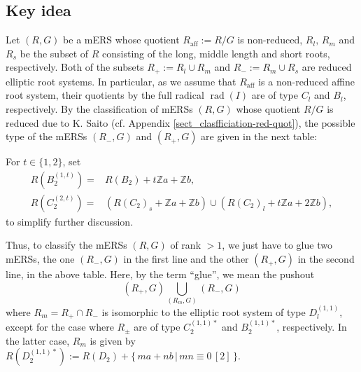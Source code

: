 \documentclass[11pt]{amsart}
\newcommand{\Z}{\mathbb{Z}}
\newcommand{\af}{\mathrm{aff}}
\newcommand{\rad}{\operatorname{rad}}
\begin{document}


\subsection{Key idea}\label{sect_3.1}
Let $(R,G)$ be a mERS whose quotient $R_{\af}:=R/G$ is non-reduced, $R_l,\, R_m$ and $R_s$ be the subset of $R$ consisting of the long, middle length and short roots, respectively. Both of the subsets $R_+:=R_l \cup R_m$ and $R_-:=R_m \cup R_s$ are reduced elliptic root systems. In particular, as we assume that $R_{\af}$ is a non-reduced affine root system, their quotients 
by the full radical $\rad(I)$ are of type $C_l$ and $B_l$, respectively. By the classification of mERSs $(R,G)$ whose quotient $R/G$ is reduced due to K. Saito \cite{Saito1985} (cf. Appendix \ref{sect_clasfficiation-red-quot}), the possible type of the mERSs $(R_{-},G)$ and $(R_{+},G)$ are given in the next table:

\begin{table}[h]
\end{table}
For $t \in \{1,2\}$, set 
\begin{align*}
R(B_2^{(1,t)})=
&R(B_2)+t\Z a+\Z b, \\
R(C_2^{(2,t)})=
&(R(C_2)_s+\Z a+\Z b) \cup (R(C_2)_l+t\Z a+2\Z b),
\end{align*}
to simplify further discussion.

Thus, to classify the mERSs $(R,G)$ of rank $>1$, we just have to glue two mERSs, the one $(R_{-},G)$  in the first line and the other $(R_{+},G)$ in the second line, in the above table. Here, by the term ``glue'', we mean the pushout
\[ (R_+,G) \bigcup_{(R_m,G)} (R_-,G) \]
where  $R_m=R_+ \cap R_-$ is isomorphic to the elliptic root system of type $D_l^{(1,1)}$, except for the case where $R_\pm$ are of type $C_2^{(1,1)\ast}$ and $B_2^{(1,1)\ast}$, respectively. In the latter case, $R_m$ is given by $R(D_2^{(1,1)\ast}):=R(D_2)+\{\, ma+nb\, \vert\, mn \equiv 0\, [2]\, \}$.
\end{document}
